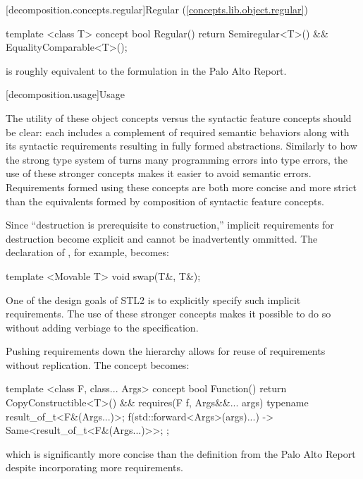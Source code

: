 [decomposition.concepts.regular]{Regular (\ref{concepts.lib.object.regular})}
\begin{codeblock}
template <class T>
concept bool Regular() {
  return Semiregular<T>() &&
    EqualityComparable<T>();
}
\end{codeblock}
 is roughly equivalent to the formulation in the Palo Alto Report.

[decomposition.usage]{Usage}

\pnum
The utility of these object concepts versus the syntactic feature concepts should be clear: each
includes a complement of required semantic behaviors along with its syntactic requirements resulting
in fully formed abstractions. Similarly to how the strong type system of \Cpp turns many programming
errors into type errors, the use of these stronger concepts makes it easier to avoid semantic errors.
Requirements formed using these concepts are both more concise and more strict than the equivalents
formed by composition of syntactic feature concepts.

\pnum
Since ``destruction is prerequisite to construction,'' implicit requirements for destruction become
explicit and cannot be inadvertently ommitted. The declaration of , for example, becomes:
\begin{codeblock}
template <Movable T>
void swap(T&, T&);
\end{codeblock}
One of the design goals of STL2 is to explicitly specify such implicit requirements. The use of these
stronger concepts makes it possible to do so without adding verbiage to the specification.

\pnum
Pushing requirements down the hierarchy allows for reuse of requirements without replication. The
 concept becomes:
\begin{codeblock}
template <class F, class... Args>
concept bool Function() {
  return CopyConstructible<T>() &&
    requires(F f, Args&&... args) {
      typename result_of_t<F&(Args...)>;
      { f(std::forward<Args>(args)...) } ->
        Same<result_of_t<F&(Args...)>>;
    };
}
\end{codeblock}
which is significantly more concise than the definition from the Palo Alto Report despite
incorporating more requirements.
